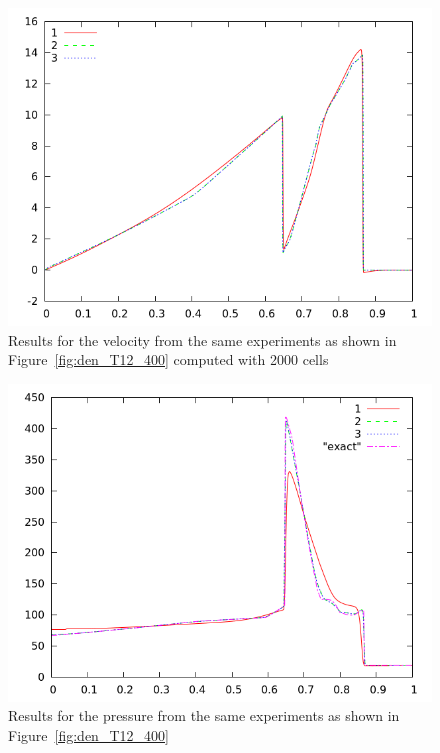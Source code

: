 \documentclass[10pt]{article}
\begin{document}
\begin{figure}[h]
  \begin{center}
     \includegraphics[width=.78\textwidth]{vel_T12_2000.png}	
  \end{center}
  \caption{Results for the velocity from the same experiments as shown in Figure~\ref{fig:den_T12_400} computed with 2000 cells}
\end{figure}

\begin{figure}[h]
  \begin{center}
     \includegraphics[width=.78\textwidth]{prs_T12_400.png}	
  \end{center}
  \caption{Results for the pressure from the same experiments as shown in Figure~\ref{fig:den_T12_400}}
\end{figure}
\end{document}
